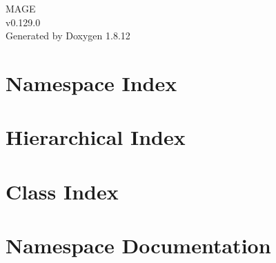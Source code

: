 \documentclass[twoside]{book}
\newcommand{\+}{\discretionary{\mbox{\scriptsize$\hookleftarrow$}}{}{}}
\newcommand{\clearemptydoublepage}{%
  \newpage{\pagestyle{empty}\cleardoublepage}%
}
\begin{document}
\hypersetup{pageanchor=false,
             bookmarksnumbered=true,
             pdfencoding=unicode
            }
\begin{titlepage}
\vspace*{7cm}
\begin{center}%
{\Large M\+A\+GE \\[1ex]\large v0.\+129.\+0 }\\
\vspace*{1cm}
{\large Generated by Doxygen 1.8.12}\\
\end{center}
\end{titlepage}
\clearemptydoublepage
{}
\tableofcontents
\clearemptydoublepage
{}
\hypersetup{pageanchor=true}

\chapter{Namespace Index}

\chapter{Hierarchical Index}

\chapter{Class Index}

\chapter{Namespace Documentation}






\end{document}
